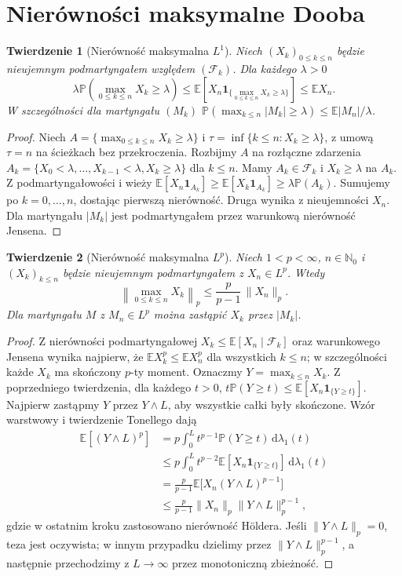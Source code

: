 \documentclass[11pt,a4paper,oneside]{report}
\numberwithin{equation}{chapter}
\theoremstyle{plain}
\newtheorem{twierdzenie}{Twierdzenie}[chapter]
\theoremstyle{definition}
\theoremstyle{remark}
\newcommand{\N}{\mathbb{N}}
\newcommand{\Prob}{\mathbb{P}}
\newcommand{\E}{\mathbb{E}}
\newcommand{\ind}[1]{\mathbf{1}_{#1}}
\newcommand{\dd}{\mathrm{d}}
\begin{document}
\section{Nierówności maksymalne Dooba}

\begin{twierdzenie}[Nierówność maksymalna $L^1$]
Niech $(X_k)_{0\leq k\leq n}$ będzie nieujemnym
podmartyngałem względem $(\mathcal F_k)$.
Dla każdego $\lambda>0$
\[
\lambda\Prob\left(\max_{0\leq k\leq n}X_k\geq\lambda\right)
\leq\E\left[X_n\ind{\{\max_{0\leq k\leq n}X_k\geq\lambda\}}\right]
\leq\E X_n.
\]
W szczególności dla martyngału $(M_k)$
$\Prob(\max_{k\leq n}|M_k|\geq\lambda)
\leq\E|M_n|/\lambda$.
\end{twierdzenie}
\begin{proof}
Niech $A=\{\max_{0\leq k\leq n}X_k\geq\lambda\}$
i $\tau=\inf\{k\leq n:X_k\geq\lambda\}$,
z umową $\tau=n$ na ścieżkach bez przekroczenia.
Rozbijmy $A$ na rozłączne zdarzenia
$A_k=\{X_0<\lambda,\ldots,X_{k-1}<\lambda,
X_k\geq\lambda\}$ dla $k\leq n$.
Mamy $A_k\in\mathcal F_k$ i
$X_k\geq\lambda$ na $A_k$.
Z podmartyngałowości i wieży
$\E[X_n\ind{A_k}]\geq\E[X_k\ind{A_k}]
\geq\lambda\Prob(A_k)$.
Sumujemy po $k=0,\ldots,n$, dostając pierwszą
nierówność. Druga wynika z nieujemności $X_n$.
Dla martyngału $|M_k|$ jest podmartyngałem
przez warunkową nierówność Jensena.
\end{proof}

\begin{twierdzenie}[Nierówność maksymalna $L^p$]
Niech $1<p<\infty$, $n\in\N_0$ i
$(X_k)_{k\leq n}$ będzie nieujemnym
podmartyngałem z $X_n\in L^p$. Wtedy
\[
\left\|\max_{0\leq k\leq n}X_k\right\|_p
\leq\frac{p}{p-1}\,\|X_n\|_p.
\]
Dla martyngału $M$ z $M_n\in L^p$ można
zastąpić $X_k$ przez $|M_k|$.
\end{twierdzenie}
\begin{proof}
Z nierówności podmartyngałowej $X_k\leq
\E[X_n\mid\mathcal F_k]$ oraz warunkowego
Jensena wynika najpierw, że
$\E X_k^p\leq\E X_n^p$ dla wszystkich $k\leq n$;
w szczególności każde $X_k$ ma skończony $p$-ty moment.
Oznaczmy $Y=\max_{k\leq n}X_k$.
Z poprzedniego twierdzenia, dla każdego $t>0$,
$t\Prob(Y\geq t)\leq\E[X_n\ind{\{Y\geq t\}}]$.
Najpierw zastąpmy $Y$ przez $Y\wedge L$,
aby wszystkie całki były skończone.
Wzór warstwowy i twierdzenie Tonellego dają
\begin{align*}
\E[(Y\wedge L)^p]
&=p\int_0^L t^{p-1}\Prob(Y\geq t)\,\dd\lambda_1(t)\\
&\leq p\int_0^L t^{p-2}
\E[X_n\ind{\{Y\geq t\}}] \,\dd\lambda_1(t)\\
&=\frac{p}{p-1}\E\bigl[X_n(Y\wedge L)^{p-1}\bigr]\\
&\leq\frac{p}{p-1}\|X_n\|_p
\|Y\wedge L\|_p^{p-1},
\end{align*}
gdzie w ostatnim kroku zastosowano nierówność
Höldera. Jeśli $\|Y\wedge L\|_p=0$, teza jest
oczywista; w innym przypadku dzielimy przez
$\|Y\wedge L\|_p^{p-1}$, a następnie
przechodzimy z $L\to\infty$ przez monotoniczną
zbieżność.
\end{proof}
\end{document}
